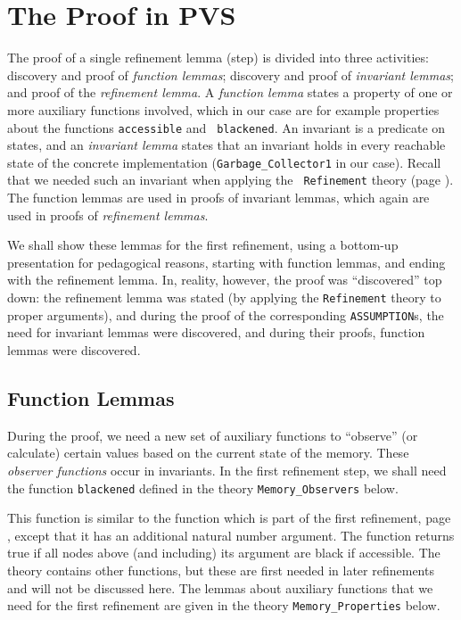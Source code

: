
\section{The Proof in PVS}
\label{pvs-proof}

\noindent The proof of a single refinement lemma (step) is divided into 
three activities:   discovery   and proof of  {\em   function lemmas};
discovery and proof of {\em  invariant lemmas}; and  proof of the {\em
  refinement lemma}\@.  A {\em function lemma}  states a property of one
or more   auxiliary functions  involved,  which  in our case   are for
example  properties  about the  functions   {\tt accessible} and  {\tt
  blackened}\@.  An invariant  is  a predicate on  states,  and  an {\em
  invariant lemma} states that an  invariant holds in every  reachable
state of the concrete implementation ({\tt Garbage\_Collector1} in our
case)\@.  Recall that we needed such an invariant when applying the {\tt
  Refinement} theory   (page  \pageref{pvs-mappings})\@.  The   function
lemmas are used in proofs of invariant lemmas, which again are used in
proofs of {\em refinement lemmas}\@.

We shall show these lemmas for the first refinement, using a bottom-up
presentation for  pedagogical reasons, starting  with function lemmas,
and ending with the refinement lemma.  In, reality, however, the proof
was ``discovered''   top  down: the refinement   lemma  was stated (by
applying the {\tt Refinement} theory to  proper arguments), and during
the proof of   the  corresponding {\tt  ASSUMPTION}s,   the need  for
invariant lemmas were   discovered, and during  their proofs, function
lemmas were discovered.


\subsection{Function Lemmas}

During  the proof,   we  need a new   set  of auxiliary  functions  to
``observe'' (or calculate)  certain values based  on the current state
of the memory.  These {\em observer functions} occur in invariants.  In
the first refinement step, we shall need  the function {\tt blackened}
defined  in   the     theory {\tt  Memory\_Observers} below.

This function is  similar to the function  which is part  of the first
refinement, page \pageref{pvs-coloured-memory}, except  that it has an
additional natural number argument.   The function returns true if all
nodes above (and including) its argument are black if accessible.  The
theory contains other  functions, but these  are first needed in later
refinements and  will  not  be  discussed   here.  The   lemmas  about
auxiliary functions that we need for the first refinement are given in
the theory {\tt Memory\_Properties} below.

